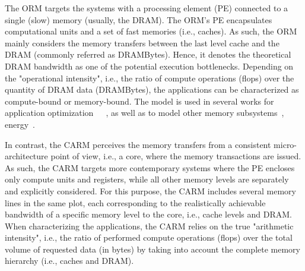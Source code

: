 \documentclass[twoside,twocolumn,8pt]{extarticle}
\begin{document}
The ORM targets the systems with a processing element (PE) connected to a single (slow) memory (usually, the DRAM). The ORM's
PE encapsulates computational units and a set of fast memories (i.e., caches). As such, the ORM mainly considers the memory
transfers between the last level cache and the DRAM (commonly referred as DRAMBytes). Hence, it denotes the theoretical DRAM
bandwidth as one of the potential execution bottlenecks. Depending on the "operational intensity", i.e., the ratio of compute
operations (flops) over the quantity of DRAM data (DRAMBytes), the applications can be characterized as compute-bound or
memory-bound. The model is used in several works for application
optimization~\cite{Kim20111201}~\cite{Rossinelli2164}~\cite{vanNieuwpoort:2009:UMH:1542275.1542337}, as well as to model other
memory subsystems~\cite{manyTaskRuntimeRooflneModel}, energy~\cite{7493653}.


In contrast, the CARM perceives the memory transfers from a consistent micro-architecture point of view, i.e., a core, where
the memory transactions are issued. As such, the CARM targets more contemporary systems where the PE encloses only compute units
and registers, while all other memory levels are separately and explicitly considered. For this purpose, the CARM includes several
memory lines in the same plot, each corresponding to the realistically achievable bandwidth of a specific memory level to the core,
i.e., cache levels and DRAM. When characterizing the applications, the CARM relies on the true "arithmetic intensity", i.e., the
ratio of performed compute operations (flops) over the total volume of requested data (in bytes) by taking into account the
complete memory hierarchy (i.e., caches and DRAM).
\end{document}
